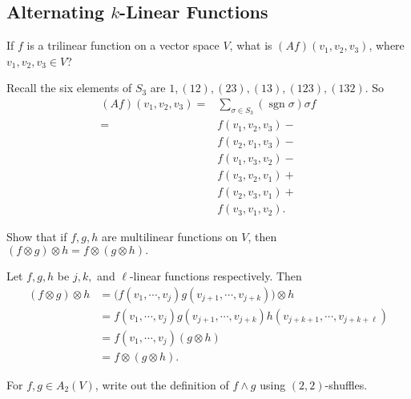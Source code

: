 \subsection{Alternating $k$-Linear Functions}
\begin{prob}
    If $f$ is a trilinear function on a vector space $V$, what is $(Af)(v_1,v_2,v_3)$, where $v_1,v_2,v_3\in V$?
\end{prob}
\begin{solution}
    Recall the six elements of $S_3$ are $1,(12),(23),(13),(123),(132)$. So
    \begin{align*}
        (Af)(v_1,v_2,v_3)=&\sum _{\sigma \in S_3}(\operatorname{sgn}\sigma)\sigma f\\
                         =&f(v_1,v_2,v_3)-\\
                                                                                   &f(v_2,v_1,v_3)-\\
                                                                                   &f(v_1,v_3,v_2)-\\
                                                                                   &f(v_3,v_2,v_1)+\\
                                                                                    &f(v_2,v_3,v_1)+\\
                                                                                    &f(v_3,v_1,v_2).
    \end{align*}
\end{solution}
\begin{prob}
Show that if $f,g,h$ are multilinear functions on $V$, then $
    (f\otimes g)\otimes h=f\otimes (g\otimes h).$
\end{prob}
\begin{solution}
    Let $f,g,h$ be $j,k,$ and $\ell$-linear functions respectively. Then 
    \begin{align*}
        (f\otimes g)\otimes h&=\big(f(v_1,\cdots ,v_j )g(v_{j+1},\cdots ,v_{j+k})\big)\otimes h\\
                             &=f(v_1,\cdots ,v_j )g(v_{j+1},\cdots ,v_{j+k})h(v_{j+k+1},\cdots ,v_{j+k+\ell})\\
                             &=f(v_1,\cdots ,v_j )(g\otimes h)\\
                             &=f\otimes (g\otimes h).
    \end{align*}
\end{solution}
\begin{prob}
    For $f,g\in A_2(V)$, write out the definition of $f\wedge g$ using $(2,2)$-shuffles.    
\end{prob}
